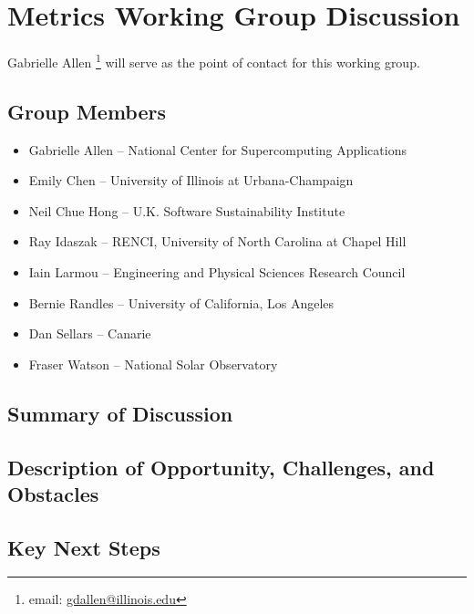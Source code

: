\section{Metrics Working Group Discussion}
\label{sec:appendix_metrics}

Gabrielle Allen \footnote{email: \href{mailto:gdallen@illinois.edu}{gdallen@illinois.edu}} will serve as the point of contact for this working group.


\subsection{Group Members}

\begin{itemize}
\item Gabrielle Allen -- National Center for Supercomputing Applications
\item Emily Chen -- University of Illinois at Urbana-Champaign
\item Neil Chue Hong -- U.K. Software Sustainability Institute
\item Ray Idaszak -- RENCI, University of North Carolina at Chapel Hill
\item Iain Larmou -- Engineering and Physical Sciences Research Council
\item Bernie Randles -- University of California, Los Angeles
\item Dan Sellars -- Canarie
\item Fraser Watson -- National Solar Observatory
\end{itemize}

\subsection{Summary of Discussion}





\subsection{Description of Opportunity, Challenges, and Obstacles}






\subsection{Key Next Steps}






